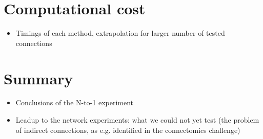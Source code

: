 




\section{Computational cost}

\begin{itemize}
    \item Timings of each method, extrapolation for larger number of tested connections
\end{itemize}

\section{Summary}

\begin{itemize}
    \item Conclusions of the N-to-1 experiment
    \item Leadup to the network experiments: what we could not yet test (the problem of indirect connections, as e.g. identified in the connectomics challenge)
\end{itemize}
